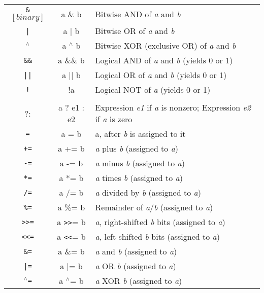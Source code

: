 \begin{fullpage}
\begin{table}[htdp]
\begin{center}
\begin{tabular}{ccl}
   \texttt{\&} $\left[binary\right]$     & a \& b   & Bitwise AND of \emph{a} and \emph{b}       \\         
   \texttt{|}              & a $|$ b   & Bitwise OR of \emph{a} and \emph{b}                 \\
   \texttt{$^{\wedge}$}              & a $^{\wedge}$ b   & Bitwise XOR (exclusive OR) of \emph{a} and \emph{b} \\
   \texttt{\&\&}             & a \&\& b  & Logical AND of \emph{a} and \emph{b} (yields 0 or 1)  \\
   \texttt{||}             & a $||$ b  & Logical OR of \emph{a} and \emph{b} (yields 0 or 1)         \\
   \texttt{!}              & !a      & Logical NOT of \emph{a} (yields 0 or 1)        \\ \\

?: & a ? e1 : e2 & Expression \emph{e1} if \emph{a} is nonzero; Expression \emph{e2} if \emph{a} is zero\\

   \texttt{=}              & a = b        & a, after \emph{b} is assigned to it            \\
   \texttt{+=}             & a += b       & \emph{a} plus \emph{b} (assigned to \emph{a})         \\        
   \texttt{-=}            & a -= b       & \emph{a} minus \emph{b} (assigned to \emph{a})      \\          
   \texttt{*=}             & a *= b       & \emph{a} times \emph{b} (assigned to \emph{a})         \\       
   \texttt{/=}             & a /= b       & \emph{a} divided by \emph{b} (assigned to \emph{a})    \\                  
   \texttt{\%=}             & a \%= b       & Remainder of \emph{a}/\emph{b} (assigned to \emph{a})     \\    
   \texttt{>>=}            & a \texttt{>>}= b      & \emph{a}, right-shifted \emph{b} bits (assigned to \emph{a})  \\
   \texttt{<<=}            & a \texttt{<<}= b      & \emph{a}, left-shifted \emph{b} bits (assigned to \emph{a})   \\
   \texttt{\&=}             & a \&= b       & \emph{a} and \emph{b} (assigned to \emph{a})          \\        
   \texttt{|=}             & a $|$= b       & \emph{a} OR \emph{b} (assigned to \emph{a})            \\       
   \texttt{$^{\wedge}$=}             & a $^{\wedge}$= b       & \emph{a} XOR \emph{b} (assigned to \emph{a})    \\
\end{tabular}
\end{center}
\label{default}
\end{table}%
\end{fullpage}

